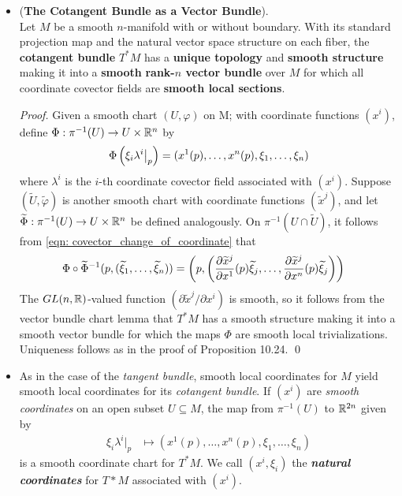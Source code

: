 \documentclass[11pt]{article}
\begin{document}
\begin{itemize}
\item 
\begin{proposition} (\textbf{The Cotangent Bundle as a Vector Bundle}).\\
Let $M$ be a smooth $n$-manifold with or without boundary. With its standard projection map and the natural vector space structure on each fiber, the \textbf{cotangent bundle} $T^{*}M$ has a \textbf{unique topology} and \textbf{smooth structure} making it into a \textbf{smooth} \textbf{rank-$n$ vector bundle} over $M$ for which all coordinate covector fields are \textbf{smooth local sections}.
\end{proposition}
\begin{proof}
Given a smooth chart $(U, \varphi)$ on M; with coordinate functions $(x^i)$, define $\Phi: \pi^{-1}(U) \rightarrow  U \times {\mathbb R}^{n}$ by
\begin{align*}
\Phi\left(\xi_{i} \lambda^{i}\bigr|_{p}\right) = (x^{1}(p), \ldots, x^{n}(p), \xi_1, \ldots, \xi_n)
\end{align*} where $\lambda^{i}$ is the $i$-th coordinate covector field associated with $(x^i)$. Suppose $(\widetilde{U}, \widetilde{\varphi})$ is another smooth chart with coordinate functions $(\widetilde{x}^j)$, and let $\widetilde{\Phi}: \pi^{-1}(U) \rightarrow  U \times {\mathbb R}^{n}$ be defined analogously. On $\pi^{-1}(U \cap \widetilde{U})$, it follows from \eqref{eqn: covector_change_of_coordinate} that
\begin{align*}
\Phi \circ \widetilde{\Phi}^{-1}(p, (\widetilde{\xi}_1, \ldots, \widetilde{\xi}_n)) &= \left(p, \left(\frac{\partial \widetilde{x}^{j}}{ \partial x^{1}}(p)\widetilde{\xi}_j, \ldots, \frac{\partial \widetilde{x}^{j}}{ \partial x^{n}}(p)\widetilde{\xi}_j\right)\right)
\end{align*} The $GL(n, {\mathbb R})$-valued function $(\partial \widetilde{x}^{j} / \partial x^{i})$ is smooth, so it follows from the vector bundle chart lemma that $T^{*}M$ has a smooth structure making it into a smooth vector bundle for which the maps $\Phi$ are smooth local trivializations. Uniqueness follows as in the proof of Proposition 10.24. \qed
\end{proof}

\item 
\begin{definition}
As in the case of the \emph{tangent bundle},  smooth local coordinates for $M$ yield smooth local coordinates for its \emph{cotangent bundle}. If $(x^i)$ are \emph{smooth coordinates} on an open subset $U \subseteq M$, the map from $\pi^{-1}(U)$ to ${\mathbb R}^{2n}$ given by
\begin{align*}
\xi_{i} \lambda^{i}\big|_{p} &\mapsto (x^{1}(p), \ldots, x^{n}(p), \xi_1, \ldots, \xi_n)
\end{align*} is a smooth coordinate chart for $T^{*}M$. We call $(x^i, \xi_i)$ the \emph{\textbf{natural coordinates}} for $T*M$ associated with $(x^i)$. 
\end{definition}


\end{itemize}
\end{document}
